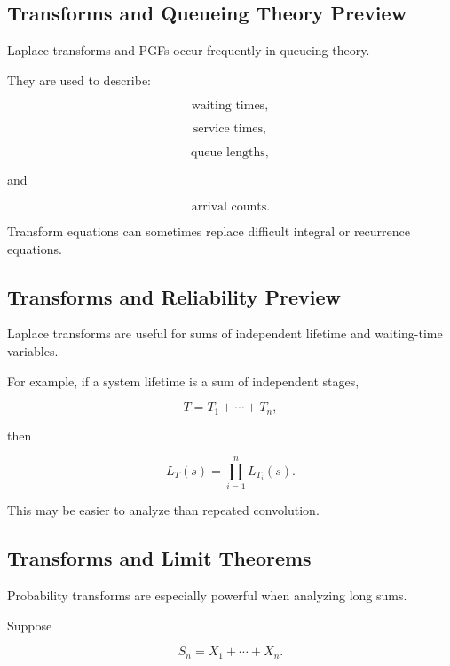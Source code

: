 \subsection{Transforms and Queueing Theory Preview}
\label{subsec:transforms-queueing-preview}

Laplace transforms and PGFs occur frequently in queueing theory.

They are used to describe:

\[
\text{waiting times},
\]

\[
\text{service times},
\]

\[
\text{queue lengths},
\]

and

\[
\text{arrival counts}.
\]

Transform equations can sometimes replace difficult integral or
recurrence equations.

\subsection{Transforms and Reliability Preview}
\label{subsec:transforms-reliability-preview}

Laplace transforms are useful for sums of independent lifetime and
waiting-time variables.

For example, if a system lifetime is a sum of independent stages,

\[
T=T_1+\cdots+T_n,
\]

then

\[
\boxed{
L_T(s)
=
\prod_{i=1}^{n}
L_{T_i}(s).
}
\]

This may be easier to analyze than repeated convolution.

\subsection{Transforms and Limit Theorems}
\label{subsec:transforms-limit-theorems}

Probability transforms are especially powerful when analyzing long
sums.

Suppose

\[
S_n=X_1+\cdots+X_n.
\]

